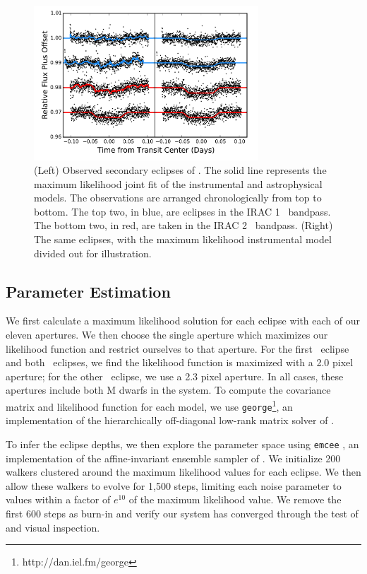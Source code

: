 \begin{figure}[htbp!]
\centerline{\includegraphics[width=0.75\textwidth]{chapter5/f1.pdf}}
\caption[Observed secondary eclipses of \LC, both with and without the maximum likelihood noise model removed]{(Left) Observed secondary eclipses of \LC. The solid line represents the maximum likelihood
joint fit of the instrumental and astrophysical models. The observations are arranged chronologically from
top to bottom. The top two, in blue, are eclipses in the IRAC 1 \ira\ bandpass. The bottom two,
in red, are taken in the IRAC 2 \irb\ bandpass. (Right) The same eclipses, with the maximum likelihood
instrumental model divided out for illustration.}
\label{fig:eclipses}
\end{figure}


\subsection{Parameter Estimation}
We first calculate a maximum likelihood solution for each eclipse with each of our 
eleven apertures. We then choose the single aperture which maximizes our likelihood
function and restrict ourselves to that aperture. 
For the first \ira\ eclipse and both \irb\ eclipses, we find the likelihood
function is maximized with a 2.0 pixel aperture;
for the other \ira\ eclipse, we use a 2.3 pixel aperture.
In all cases, these apertures include both M dwarfs in the system.
To compute the covariance matrix and likelihood function for each model,
we use \texttt{george}\footnote{http://dan.iel.fm/george}, 
an implementation of the hierarchically off-diagonal low-rank matrix solver of
\citet{Ambikasaran15}.


To infer the eclipse depths, we then explore the parameter space 
using \texttt{emcee} \citep{Foreman-Mackey12},
an implementation of the affine-invariant ensemble sampler of \citet{Goodman10}.
We initialize 200 walkers clustered around the maximum likelihood
values for each eclipse. 
We then allow these walkers to evolve for 1,500 steps, limiting 
each noise parameter to values within a factor of $e^{10}$ of the maximum 
likelihood value.
We remove the first 600 steps as burn-in and
verify our system has converged through the test of \citet{Geweke92} and 
visual inspection.

